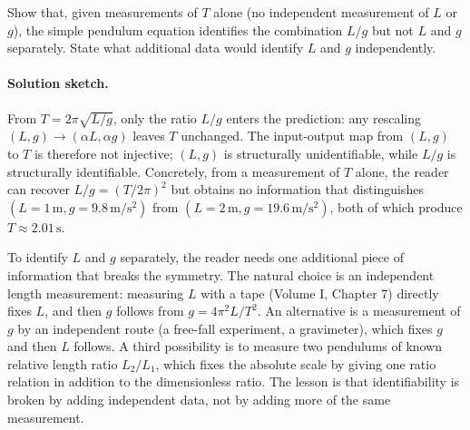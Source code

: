 \begin{exercise}
Show that, given measurements of $T$ alone (no independent
measurement of $L$ or $g$), the simple pendulum equation
identifies the combination $L/g$ but not $L$ and $g$
separately. State what additional data would identify $L$ and
$g$ independently.

\paragraph{Solution sketch.} From $T = 2\pi\sqrt{L/g}$, only the
ratio $L/g$ enters the prediction: any rescaling
$(L, g) \to (\alpha L, \alpha g)$ leaves $T$ unchanged. The
input-output map from $(L, g)$ to $T$ is therefore not injective;
$(L, g)$ is structurally unidentifiable, while $L/g$ is
structurally identifiable. Concretely, from a measurement of $T$
alone, the reader can recover $L/g = (T/2\pi)^{2}$ but obtains no
information that distinguishes $(L = 1\,\si{\meter}, g =
9.8\,\si{\meter\per\square\second})$ from $(L = 2\,\si{\meter},
g = 19.6\,\si{\meter\per\square\second})$, both of which produce
$T \approx 2.01\,\si{\second}$.

To identify $L$ and $g$ separately, the reader needs one additional
piece of information that breaks the symmetry. The natural choice
is an independent length measurement: measuring $L$ with a tape
(Volume I, Chapter 7) directly fixes $L$, and then $g$ follows
from $g = 4\pi^{2} L / T^{2}$. An alternative is a measurement of
$g$ by an independent route (a free-fall experiment, a gravimeter),
which fixes $g$ and then $L$ follows. A third possibility is to
measure two pendulums of known relative length ratio $L_{2}/L_{1}$,
which fixes the absolute scale by giving one ratio relation in
addition to the dimensionless ratio. The lesson is that
identifiability is broken by adding independent data, not by adding
more of the same measurement.
\end{exercise}

